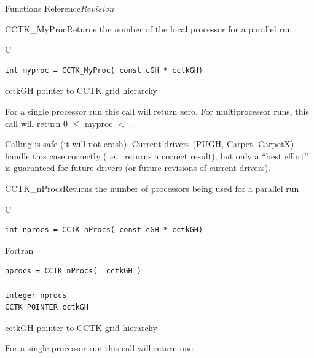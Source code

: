 \begin{cactuspart}{ Functions Reference}{}{$Revision$}
\begin{FunctionDescription}{CCTK\_MyProc}{Returns the number of the local processor for a parallel run}
\label{CCTK-MyProc}
\begin{SynopsisSection}
\begin{Synopsis}{C}
\begin{verbatim}int myproc = CCTK_MyProc( const cGH * cctkGH)\end{verbatim}
\end{Synopsis}
\end{SynopsisSection}
\begin{ParameterSection}
\begin{Parameter}{cctkGH}
pointer to CCTK grid hierarchy
\end{Parameter}
\end{ParameterSection}
\begin{Discussion}
For a single processor run this call will return zero. For multiprocessor
runs, this call will return 0 $\leq$ myproc $<$ .

Calling  is safe (it will not crash).
Current drivers (PUGH, Carpet, CarpetX) handle this case correctly
(i.e.\  returns a correct result), but only
a ``best effort'' is guaranteed for future drivers (or future revisions
of current drivers).
\end{Discussion}
\end{FunctionDescription}






\begin{FunctionDescription}{CCTK\_nProcs}{Returns the number of processors being used for a parallel run}
\label{CCTK-nProcs}
\begin{SynopsisSection}
\begin{Synopsis}{C}
\begin{verbatim}int nprocs = CCTK_nProcs( const cGH * cctkGH)\end{verbatim}
\end{Synopsis}
\begin{Synopsis}{Fortran}
\begin{verbatim}nprocs = CCTK_nProcs(  cctkGH )

integer nprocs
CCTK_POINTER cctkGH\end{verbatim}
\end{Synopsis}
\end{SynopsisSection}
\begin{ParameterSection}
\begin{Parameter}{cctkGH}
pointer to CCTK grid hierarchy
\end{Parameter}
\end{ParameterSection}
\begin{Discussion}
For a single processor run this call will return one.


\end{Discussion}
\end{FunctionDescription}
\end{cactuspart}
